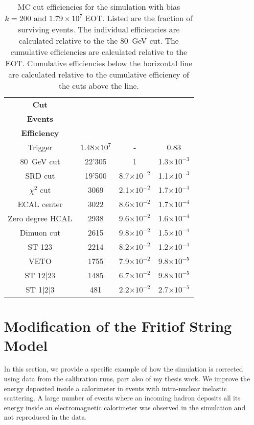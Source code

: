 \begin{table}[htbp]
	\centering
	\caption[MC cut efficiencies for the simulation with bias $k=200$ and $1.79\times10^7$ EOT.]{MC cut efficiencies for the simulation with bias $k=200$ and $1.79\times10^7$ EOT. Listed are the fraction of surviving events. The individual efficiencies are calculated relative to the the 80~GeV cut. The cumulative efficiencies are calculated relative to the EOT. Cumulative efficiencies below the horizontal line are calculated relative to the cumulative efficiency of the cuts above the line.}
	\begin{tabular}{|cccc|}
		\toprule
		\textbf{Cut} & \thead{\textbf{Surviving}\\\textbf{Events}} & \thead{\textbf{Efficiency}}& \thead{\textbf{Cumulative}\\\textbf{Efficiency}}\\
		\midrule
		Trigger & 1.48$\times10^{7}$ & - & 0.83\\ 
		80~GeV cut & 22'305 & 1 & 1.3$\times 10^{-3}$\\
		SRD cut & 19'500 & 8.7$\times 10^{-2}$ & 1.1$\times 10^{-3}$\\
		$\chi^2$ cut & 3069 & 2.1$\times 10^{-2}$ & 1.7$\times 10^{-4}$\\
		ECAL center & 3022 & 8.6$\times 10^{-2}$ & 1.7$\times 10^{-4}$\\
		Zero degree HCAL & 2938 & 9.6$\times 10^{-2}$ & 1.6$\times 10^{-4}$\\
		Dimuon cut & 2615 & 9.8$\times 10^{-2}$ & 1.5$\times 10^{-4}$\\
		\midrule
		ST 123 & 2214 & 8.2$\times 10^{-2}$ & 1.2$\times 10^{-4}$\\
		VETO & 1755 & 7.9$\times 10^{-2}$ & 9.8$\times 10^{-5}$\\
		ST 12|23 & 1485 & 6.7$\times 10^{-2}$ & 9.8$\times 10^{-5}$\\
		ST 1|2|3 & 481 & 2.2$\times 10^{-2}$ & 2.7$\times 10^{-5}$\\
		\bottomrule
	\end{tabular}
	\label{res:Tab:mccuts}
      \end{table}

\FloatBarrier\noindent
\section{Modification of the Fritiof String Model}
\label{appC:sec:ftfp-modifications}

In this section, we provide a specific example of how the simulation is corrected using data from the calibration runs, part also of my thesis work. We improve the energy deposited inside a calorimeter in events with intra-nuclear inelastic scattering. A large number of events where an incoming hadron deposits all its energy inside an electromagnetic calorimeter was observed in the simulation and not reproduced in the data.

